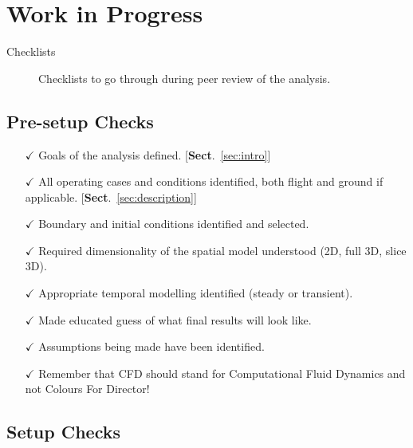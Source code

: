 \section{Work in Progress}

\begin{description}
    \item[Checklists] Checklists to go through during peer review of the analysis.
\end{description}

\subsection*{Pre-setup Checks}
\begin{itemize}
    \item[$\checkmark$] Goals of the analysis defined. [\textbf{Sect}.~\ref{sec:intro}]
    \item[$\checkmark$] All operating cases and conditions identified, both flight and ground if applicable. [\textbf{Sect}.~\ref{sec:description}]
    \item[$\checkmark$] Boundary and initial conditions identified and selected.
    \item[$\checkmark$] Required dimensionality of the spatial model understood (2D, full 3D, slice 3D).
    \item[$\checkmark$] Appropriate temporal modelling identified (steady or transient).
    \item[$\checkmark$] Made educated guess of what final results will look like.
    \item[$\checkmark$] Assumptions being made have been identified.
    \item[$\checkmark$] Remember that CFD should stand for Computational Fluid Dynamics and not Colours For Director!
\end{itemize}

\subsection*{Setup Checks}

